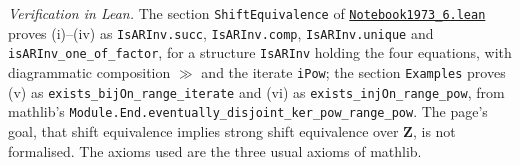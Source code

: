 \emph{Verification in Lean.} The section \texttt{ShiftEquivalence} of \href{\leanblobmain/Notebook1973_6.lean}{\texttt{Notebook1973\_6.\allowbreak{}lean}} proves (i)--(iv) as \texttt{IsARInv.succ}, \texttt{IsARInv.comp}, \texttt{IsARInv.unique} and \texttt{isARInv\_one\_of\_factor}, for a structure \texttt{IsARInv} holding the four equations, with diagrammatic composition $\gg$ and the iterate \texttt{iPow}; the section \texttt{Examples} proves (v) as \texttt{exists\_bijOn\_range\_iterate} and (vi) as \texttt{exists\_injOn\_range\_pow}, from mathlib's \texttt{Module.End.eventually\_disjoint\_ker\_pow\_range\_pow}. The page's goal, that shift equivalence implies strong shift equivalence over $\mathbf Z$, is not formalised. The axioms used are the three usual axioms of mathlib.

